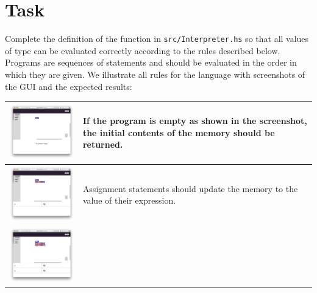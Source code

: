 \section{Task}

Complete the definition of the  function in \texttt{\small src/Interpreter.hs} so that all values of type  can be evaluated correctly according to the rules described below. Programs are sequences of statements and should be evaluated in the order in which they are given. We illustrate all rules for the language with screenshots of the GUI and the expected results:

\begin{center}
	\begin{longtable}[t]{|c|p{5cm}|}
		\hline 
		\includegraphics[align=t,width=250px]{cswk/0-empty.png} & 
		If the program is empty as shown in the screenshot, the initial contents of the memory should be returned. \\ \hline 
		\includegraphics[align=t,width=250px]{cswk/1-assignment.png} & 
		Assignment statements should update the memory to the value of their expression. \\ \hline 
		\includegraphics[align=t,width=250px]{cswk/2-loading.png} &

\end{longtable}
\end{center}
